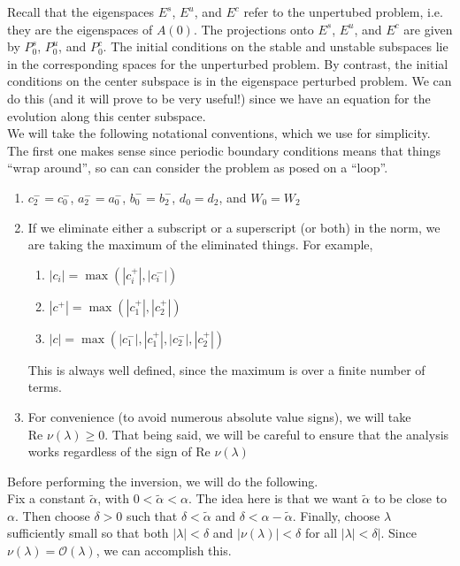 \documentclass[12pt]{article}
\begin{document}
Recall that the eigenspaces $E^s$, $E^u$, and $E^c$ refer to the unpertubed problem, i.e. they are the eigenspaces of $A(0)$. The projections onto $E^s$, $E^u$, and $E^c$ are given by $P_0^s$, $P_0^u$, and $P_0^c$. The initial conditions on the stable and unstable subspaces lie in the corresponding spaces for the unperturbed problem. By contrast, the initial conditions on the center subspace is in the eigenspace perturbed problem. We can do this (and it will prove to be very useful!) since we have an equation for the evolution along this center subspace.\\

We will take the following notational conventions, which we use for simplicity. The first one makes sense since periodic boundary conditions means that things ``wrap around'', so can can consider the problem as posed on a ``loop''.

\begin{enumerate}
\item $c_2^- = c_0^-$, $a_2^- = a_0^-$, $b_0^- = b_2^-$, $d_0 = d_2$, and $W_0 = W_2$
\item If we eliminate either a subscript or a superscript (or both) in the norm, we are taking the maximum of the eliminated things. For example,
	\begin{enumerate}
		\item $|c_i| = \max(|c_i^+|, |c_i^-|)$ 
		\item $|c^+| = \max(|c_1^+|, |c_2^+|)$
		\item $|c| = \max(|c_1^-|, |c_1^+|, |c_2^-|, |c_2^+|)$
	\end{enumerate}
	This is always well defined, since the maximum is over a finite number of terms.
\item For convenience (to avoid numerous absolute value signs), we will take $\text{Re }\nu(\lambda) \geq 0$. That being said, we will be careful to ensure that the analysis works regardless of the sign of $\text{Re }\nu(\lambda)$
\end{enumerate}

Before performing the inversion, we will do the following.\\

Fix a constant $\tilde{\alpha}$, with $0 < \tilde{\alpha} < \alpha$. The idea here is that we want $\tilde{\alpha}$ to be close to $\alpha$. Then choose $\delta> 0$ such that $\delta < \tilde{\alpha}$ and $\delta < \alpha - \tilde{\alpha}$. Finally, choose $\lambda$ sufficiently small so that both $|\lambda| < \delta$ and $|\nu(\lambda)| < \delta$ for all $|\lambda| < \delta|$. Since $\nu(\lambda) = \mathcal{O}(\lambda)$, we can accomplish this. \\
\end{document}
